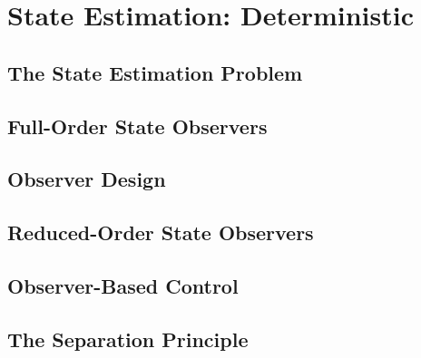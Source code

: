 \chapter{State Estimation: Deterministic} \label{ch:observer}

	\section{The State Estimation Problem}

	\section{Full-Order State Observers}

	\section{Observer Design}

	\section{Reduced-Order State Observers}

	\section{Observer-Based Control}

	\section{The Separation Principle}